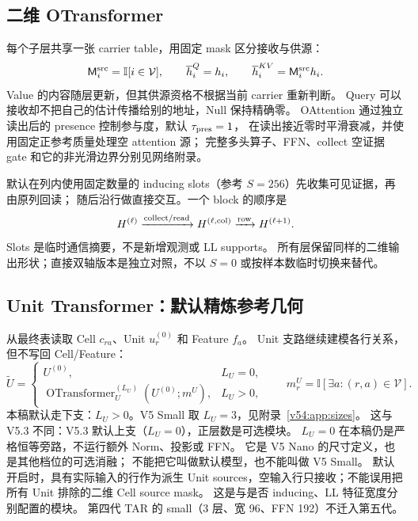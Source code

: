 \documentclass[11pt,UTF8,fontset=fandol]{ctexart}
\numberwithin{equation}{section}
\theoremstyle{definition}
\newcommand{\Vset}{\mathcal V}
\newcommand{\ind}{\mathbb I}
\begin{document}
\subsection{二维 OTransformer}
每个子层共享一张 carrier table，用固定 mask 区分接收与供源：
\begin{equation}
 \mathsf M_i^{\rm src}=\ind[i\in\Vset],\qquad
 \overline h_i^Q=h_i,\qquad \overline h_i^{KV}=\mathsf M_i^{\rm src}h_i.
 \label{front:eq:role-views}
\end{equation}
Value 的内容随层更新，但其供源资格不根据当前 carrier 重新判断。
Query 可以接收却不把自己的估计传播给别的地址，Null 保持精确零。
OAttention 通过独立读出后的 presence 控制参与度，默认 $\tau_{\rm pres}=1$，
在读出接近零时平滑衰减，并使用固定正参考质量处理空 attention 源；
完整多头算子、FFN、collect 空证据 gate 和它的非光滑边界分别见网络附录。

默认在列内使用固定数量的 inducing slots（参考 $S=256$）先收集可见证据，再由原列回读；
随后沿行做直接交互。一个 block 的顺序是
\begin{equation}
 H^{(\ell)}\xrightarrow{\rm collect/read}H^{(\ell,\rm col)}
                   \xrightarrow{\rm row}H^{(\ell+1)}.
 \label{front:eq:layer-order}
\end{equation}
Slots 是临时通信摘要，不是新增观测或 LL supports。
所有层保留同样的二维输出形状；直接双轴版本是独立对照，不以 $S=0$ 或按样本数临时切换来替代。

\subsection{Unit Transformer：默认精炼参考几何}
\label{v51:sec:unit-main}
从最终表读取 Cell $c_{ra}$、Unit $u_r^{(0)}$ 和 Feature $f_a$。
Unit 支路继续建模各行关系，但不写回 Cell/Feature：
\begin{equation}
 \widetilde U=\begin{cases}
 U^{(0)},&L_U=0,\\
 \operatorname{OTransformer}_{U}^{(L_U)}(U^{(0)};m^U),&L_U>0,
 \end{cases}\qquad
 m_r^U=\ind[\exists a:(r,a)\in\Vset].
 \label{v51:eq:unit-switch}
\end{equation}
本稿默认走下支：$L_U>0$。V5 Small 取 $L_U=3$，见附录~\ref{v54:app:sizes}。
这与 V5.3 不同：V5.3 默认上支（$L_U=0$），正层数是可选模块。
$L_U=0$ 在本稿仍是严格恒等旁路，不运行额外 Norm、投影或 FFN。
它是 V5 Nano 的尺寸定义，也是其他档位的可选消融；
不能把它叫做默认模型，也不能叫做 V5 Small。
默认开启时，具有实际输入的行作为派生 Unit sources，空输入行只接收；不能误用把所有 Unit 排除的二维 Cell source mask。
这是与是否 inducing、LL 特征宽度分别配置的模块。
第四代 TAR 的 small（3 层、宽 96、FFN 192）不迁入第五代。
\end{document}
